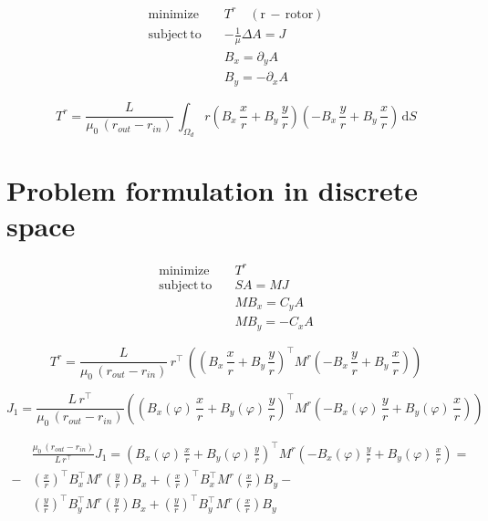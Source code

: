 \begin{align*} 
\mathrm{minimize}\quad  &  T^r \quad \mathrm{(r\,-\,rotor)} \\
\mathrm{subject \, to}\quad  & - \frac{1}{\mu} \Delta A = J \\
&  B_x = \partial_y A \\
&  B_y = - \partial_x A
\end{align*}

\begin{equation} \label{eq:43} 
T^r = \frac{L}{\mu_0\,\left(r_{out} - r_{in}\right)}\, \int_{\Omega_d} r \left(  B_x \,\frac{x}{r} + B_y \,\frac{y}{r} \right) \left( - B_x \,\frac{y}{r} + B_y \,\frac{x}{r} \right) \,\mathrm{d}S
\end{equation}

\section{Problem formulation in discrete space}

\begin{align*} 
\mathrm{minimize}\quad  &  T^r \\
\mathrm{subject \, to}\quad  &  S A = M J \\
&  M B_x = C_y A \\
&  M B_y = -C_x A 
\end{align*}


\begin{equation} \label{eq:44} 
T^r = \frac{L}{\mu_0\,\left(r_{out} - r_{in}\right)} \, r^\top \, \left( \left(  B_x \,\frac{x}{r} + B_y \,\frac{y}{r} \right)^\top M^r \left( - B_x \,\frac{y}{r} + B_y \,\frac{x}{r} \right) \right)
\end{equation}


\begin{equation}
J_1 =\frac{L \, r^\top}{\mu_0\,\left(r_{out} - r_{in}\right)} \left( \left(  B_x \left(\varphi\right) \,\frac{x}{r} + B_y \left(\varphi\right) \,\frac{y}{r} \right)^\top M^r \left( - B_x \left(\varphi\right) \,\frac{y}{r} + B_y \left(\varphi\right) \,\frac{x}{r} \right) \right)
\end{equation}

\begin{align*}
&\frac{\mu_0\,\left(r_{out} - r_{in}\right)}{L\,r^\top} J_1 =  \left(  B_x \left(\varphi\right) \,\frac{x}{r} + B_y \left(\varphi\right) \,\frac{y}{r} \right)^\top M^r \left( - B_x \left(\varphi\right) \,\frac{y}{r} + B_y \left(\varphi\right) \,\frac{x}{r} \right) = \\
 - &\left(\frac{x}{r}\right)^\top B_x^\top  M^r \left(\frac{y}{r}\right) B_x  + \left(\frac{x}{r}\right)^\top B_x^\top  M^r \left( \frac{x}{r}\right) B_y  - \\
&\left(\frac{y}{r}\right)^\top B_y^\top  M^r \left(\frac{y}{r}\right) B_x  + \left(\frac{y}{r}\right)^\top B_y^\top M^r \left( \frac{x}{r}\right) B_y 
\end{align*}

